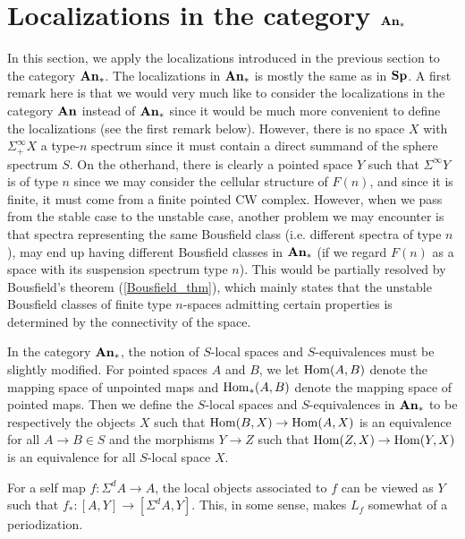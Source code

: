 \section{Localizations in the category $\mathbf{An}_*$}

	In this section, we apply the localizations introduced in the previous section to the category $\mathbf{An}_*$. The localizations in $\mathbf{An}_*$ is mostly the same as in $\mathbf{Sp}$. 
	A first remark here is that we would very much like to consider the localizations in the category $\mathbf{An}$ instead of $\mathbf{An}_*$ since it would be much more convenient to define the localizations (see the first remark below). However, there is no space $X$ with $\Sigma_+^\infty X$ a type-$n$ spectrum since it must contain a direct summand of the sphere spectrum $S$. On the otherhand, there is clearly a pointed space $Y$ such that $\Sigma^\infty Y$ is of type $n$ since we may consider the cellular structure of $F(n)$, and since it is finite, it must come from a finite pointed CW complex. 
	However, when we pass from the stable case to the unstable case, another problem we may encounter is that spectra representing the same Bousfield class (i.e. different spectra of type $n$), may end up having different Bousfield classes in $\mathbf{An}_*$ (if we regard $F(n)$ as a space with its suspension spectrum type $n$). This would be partially resolved by Bousfield's theorem (\cref{Bousfield_thm}), which mainly states that the unstable Bousfield classes of finite type $n$-spaces admitting certain properties is determined by the connectivity of the space. 

	\begin{const}
		In the category $\mathbf{An}_*$, the notion of $S$-local spaces and $S$-equivalences must be slightly modified. For pointed spaces $A$ and $B$, we let $\operatorname{\mathrm{Hom}}(A,B)$ denote the mapping space of unpointed maps and $\operatorname{\mathrm{Hom}}_*(A,B)$ denote the mapping space of pointed maps. Then we define the $S$-local spaces and $S$-equivalences in $\mathbf{An}_*$ to be respectively the objects $X$ such that $\operatorname{\mathrm{Hom}}(B,X)\to\operatorname{\mathrm{Hom}}(A,X)$ is an equivalence for all $A\to B\in S$ and the morphisms $Y\to Z$ such that $\operatorname{\mathrm{Hom}}(Z,X)\to\operatorname{\mathrm{Hom}}(Y,X)$ is an equivalence for all $S$-local space $X$. 
	\end{const}

	\begin{remark}
		For a self map $f:\Sigma^dA\to A$, the local objects associated to $f$ can be viewed as $Y$ such that $f_*:[A,Y]\to[\Sigma^dA,Y]$. This, in some sense, makes $L_f$ somewhat of a periodization. 
	\end{remark}


